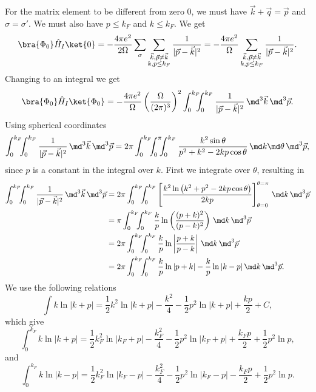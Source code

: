  For the matrix element to be different from zero $0$, we must have $\vec k + \vec q = \vec p$ and  $\sigma = \sigma'$. We must also have $p \leq k_F$ and $k \leq k_F$. We get
\[ \bra{\Phi_0} \hat H_I \ket{0} =
-\frac{4\pi e^2}{2\Omega} \sum_{\sigma} \sum_{\substack{\vec k, \vec p \neq \vec k \\ k, p \leq k_F}} \frac{1}{|\vec p - \vec k|^2} =
-\frac{4\pi e^2}{\Omega} \sum_{\substack{\vec k, \vec p \neq \vec k \\ k, p \leq k_F}} \frac{1}{|\vec p - \vec k|^2}. \]
%
Changing to an integral we get
\[ \bra{\Phi_0} \hat H_I \ket{\Phi_0} =
-\frac{4\pi e^2}{\Omega} \left( \frac{\Omega}{(2\pi)^3} \right)^2 \int_0^{k_F} \!\!\!\! \int_0^{k_F} \frac{1}{|\vec p - \vec k|^2} \, \md^3 \vec k \, \md^3 \vec p . \]
%
Using spherical coordinates 
\[ \int_0^{k_F} \!\!\! \int_0^{k_F} \frac{1}{|\vec p - \vec k|^2} \, \md^3 \vec k \, \md^3 \vec p =
2\pi \int_0^{k_F} \!\!\! \int_0^\pi \!\!\! \int_0^{k_F} \frac{k^2 \sin \theta}{p^2 + k^2 - 2kp \cos \theta} \, \md k \md \theta \, \md^3 \vec p , \]
%
since $p$ is a constant in the integral over $k$. First we integrate over  $\theta$, resulting in
\begin{align*}
\int_0^{k_F} \!\!\! \int_0^{k_F} \frac{1}{|\vec p - \vec k|^2} \, \md^3 \vec k \, \md^3 \vec p &=
%
2\pi \int_0^{k_F} \!\!\! \int_0^{k_F} \left[ \frac{k^2 \ln \left( k^2 + p^2 - 2kp\cos \theta \right)}{2kp} \right]_{\theta = 0}^{\theta = \pi} \, \md k \, \md^3 \vec p \\
%
&= \pi \int_0^{k_F} \!\!\! \int_0^{k_F} \frac{k}{p} \ln \left( \frac{(p + k)^2}{(p - k)^2} \right) \, \md k \, \md^3 \vec p \\
%
&= 2\pi \int_0^{k_F} \!\!\! \int_0^{k_F} \frac{k}{p} \ln \left| \frac{p + k}{p - k} \right| \, \md k \, \md^3 \vec p \\
%
&= 2\pi \int_0^{k_F} \!\!\! \int_0^{k_F} \frac{k}{p} \ln | p + k| - \frac{k}{p} \ln|k-p| \, \md k \, \md^3 \vec p .
\end{align*}
We use the following relations
\[ \int k\ln|k+p| = \frac{1}{2} k^2 \ln|k + p| - \frac{k^2}{4} - \frac{1}{2} p^2 \ln|k+p| + \frac{kp}{2} + C , \]
%
which give
\[ \int_0^{k_F} k\ln|k+p| = \frac{1}{2} k_F^2 \ln|k_F + p| - \frac{k_F^2}{4} - \frac{1}{2} p^2 \ln|k_F+p| + \frac{k_F p}{2} + \frac{1}{2} p^2 \ln p , \]
%
and
\[ \int_0^{k_F} k\ln|k-p| = \frac{1}{2} k_F^2 \ln|k_F - p| - \frac{k_F^2}{4} - \frac{1}{2} p^2 \ln|k_F-p| - \frac{k_F p}{2} + \frac{1}{2} p^2 \ln p . \]

